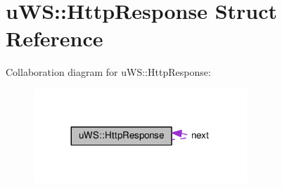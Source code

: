 \hypertarget{structu_w_s_1_1_http_response}{}\section{u\+WS\+:\+:Http\+Response Struct Reference}
\label{structu_w_s_1_1_http_response}


Collaboration diagram for u\+WS\+:\+:Http\+Response\+:
\nopagebreak
\begin{figure}[H]
\begin{center}
\leavevmode
\includegraphics[width=227pt]{structu_w_s_1_1_http_response__coll__graph}
\end{center}
\end{figure}
